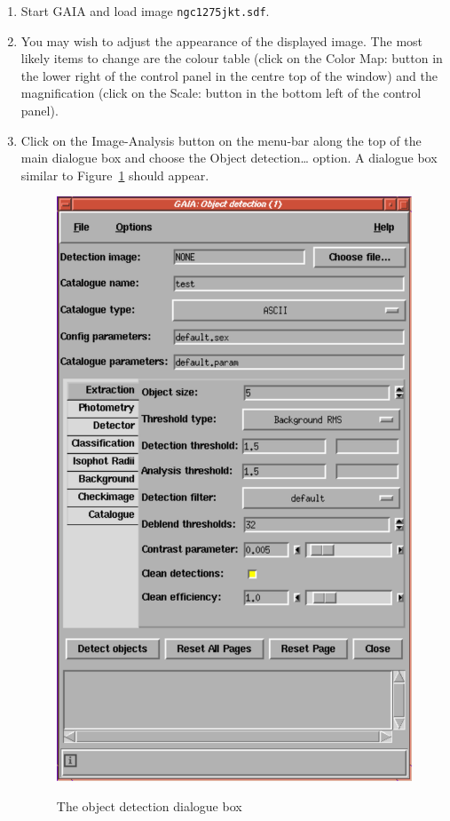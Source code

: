 \documentclass[twoside,11pt]{starlink}
\begin{document}
\begin{enumerate}

  \item Start GAIA and load image \texttt{ngc1275jkt.sdf}.

  \item You may wish to adjust the appearance of the displayed image.
   The most likely items to change are the colour table (click on the \textsf{Color Map:} button in the lower right of the control panel in the centre
   top of the window) and the magnification (click on the \textsf{Scale:}
   button in the bottom left of the control panel).

  \item Click on the \textsf{Image-Analysis} button on the menu-bar along the
   top of the main dialogue box and choose the \textsf{Object detection\ldots}
   option.  A dialogue box similar to Figure~\ref{OBJECT_R_DETECT} should
   appear.

  \begin{figure}[htbp]
     \centering
     \includegraphics[totalheight=3.75in]{sc17_object_r_detect}
     \begin{quote}
     \caption{The object detection dialogue box
     \label{OBJECT_R_DETECT} }
     \end{quote}
  \end{figure}


\end{enumerate}
\end{document}
